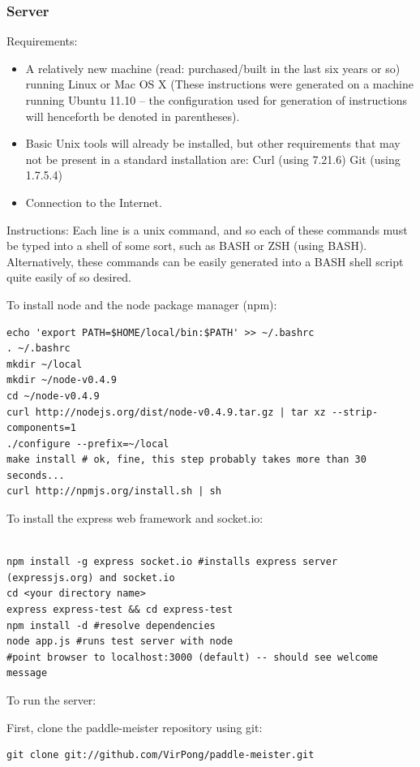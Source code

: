 \documentclass[letterpaper,12pt]{article}
\begin{document}
\subsubsection{Server}
Requirements:
\begin{itemize}
\item A relatively new machine (read: purchased/built in the last six years or so) running Linux or Mac OS X (These instructions were generated on a machine running Ubuntu 11.10 -- the configuration used for generation of instructions will henceforth be denoted in parentheses).
\item Basic Unix tools will already be installed, but other requirements that may not be present in a standard installation are:
Curl (using 7.21.6)
Git (using 1.7.5.4)
\item Connection to the Internet. 
\end{itemize}
Instructions:
Each line is a unix command, and so each of these commands must be typed into a shell of some sort, such as BASH or ZSH (using BASH). Alternatively, these commands can be easily generated into a BASH shell script quite easily of so desired.

To install node and the node package manager (npm):

\begin{verbatim}
echo 'export PATH=$HOME/local/bin:$PATH' >> ~/.bashrc
. ~/.bashrc
mkdir ~/local
mkdir ~/node-v0.4.9
cd ~/node-v0.4.9
curl http://nodejs.org/dist/node-v0.4.9.tar.gz | tar xz --strip-components=1
./configure --prefix=~/local
make install # ok, fine, this step probably takes more than 30 seconds...
curl http://npmjs.org/install.sh | sh
\end{verbatim}

To install the express web framework and socket.io:

\begin{verbatim}

npm install -g express socket.io #installs express server (expressjs.org) and socket.io
cd <your directory name>
express express-test && cd express-test
npm install -d #resolve dependencies
node app.js #runs test server with node
#point browser to localhost:3000 (default) -- should see welcome message
\end{verbatim}

To run the server:

First, clone the paddle-meister repository using git:

\begin{verbatim}
git clone git://github.com/VirPong/paddle-meister.git
\end{verbatim}
\end{document}
